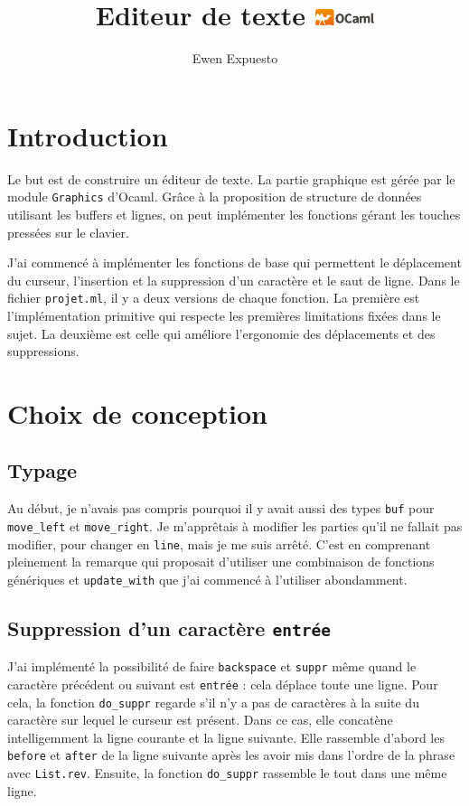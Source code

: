 \documentclass[a4paper,12pt]{article}
\title{Editeur de texte \includegraphics[width=0.13\textwidth]{OCaml_Logo.jpg}}
\author{Ewen Expuesto}
\date{}
\begin{document}
\maketitle

\tableofcontents
\newpage

\section{Introduction}
Le but est de construire un éditeur de texte. La partie graphique est gérée par le module \texttt{Graphics} d'Ocaml. Grâce à la proposition de structure de données utilisant les buffers et lignes, on peut implémenter les fonctions gérant les touches pressées sur le clavier.

J'ai commencé à implémenter les fonctions de base qui permettent le déplacement du curseur, l'insertion et la suppression d'un caractère et le saut de ligne. Dans le fichier \texttt{projet.ml}, il y a deux versions de chaque fonction. La première est l'implémentation primitive qui respecte les premières limitations fixées dans le sujet. La deuxième est celle qui améliore l'ergonomie des déplacements et des suppressions.

\section{Choix de conception}

\subsection{Typage}
Au début, je n'avais pas compris pourquoi il y avait aussi des types \texttt{buf} pour \texttt{move\_left} et \texttt{move\_right}. Je m'apprêtais à modifier les parties qu'il ne fallait pas modifier, pour changer en \texttt{line}, mais je me suis arrêté. C'est en comprenant pleinement la remarque qui proposait d'utiliser une combinaison de fonctions génériques et \texttt{update\_with} que j'ai commencé à l'utiliser abondamment.

\subsection{Suppression d'un caractère \texttt{entrée}}
J'ai implémenté la possibilité de faire \texttt{backspace} et \texttt{suppr} même quand le caractère précédent ou suivant est \texttt{entrée} : cela déplace toute une ligne. Pour cela, la fonction \texttt{do\_suppr} regarde s'il n'y a pas de caractères à la suite du caractère sur lequel le curseur est présent. Dans ce cas, elle concatène intelligemment la ligne courante et la ligne suivante. Elle rassemble d'abord les \texttt{before} et \texttt{after} de la ligne suivante après les avoir mis dans l'ordre de la phrase avec \texttt{List.rev}. Ensuite, la fonction \texttt{do\_suppr} rassemble le tout dans une même ligne.
\end{document}
